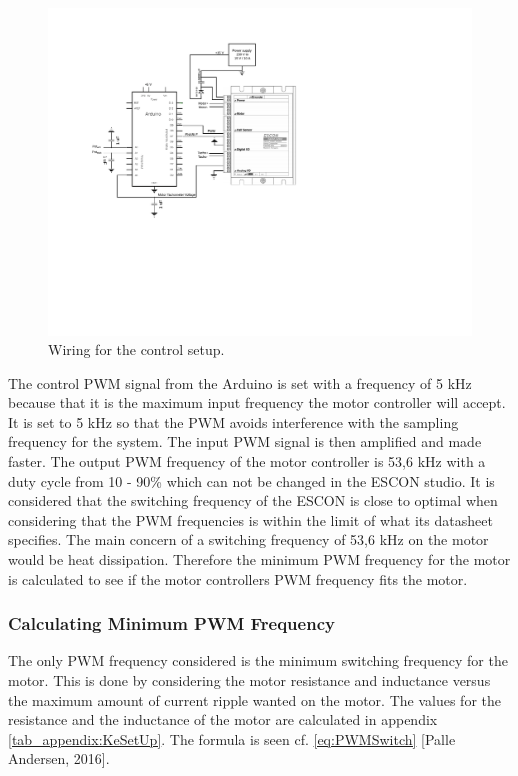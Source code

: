 \begin{figure}[htbp]
\centering
\includegraphics[width=0.85\linewidth]{figures/MotorControllerSetup}
\caption{Wiring for the control setup.}
\label{fig:EsconWiring}
\end{figure}
\newpage
The control PWM signal from the Arduino is set with a frequency of 5 kHz because that it is the maximum input frequency the motor controller will accept. It is set to 5 kHz so that the PWM avoids interference with the sampling frequency for the system.
The input PWM signal is then amplified and made faster. The output PWM frequency of the motor controller is 53,6 kHz with a duty cycle from 10 - 90\% which can not be changed in the ESCON studio. It is considered that the switching frequency of the ESCON is close to optimal when considering that the PWM frequencies is within the limit of what its datasheet specifies.   The main concern of a switching frequency of 53,6 kHz on the motor would be heat dissipation. Therefore the minimum PWM frequency for the motor is calculated to see if the motor controllers PWM frequency fits the motor.

\subsubsection{Calculating Minimum PWM Frequency}
The only PWM frequency considered is the minimum switching frequency for the motor. This is done by considering the motor resistance and inductance versus the maximum amount of current ripple wanted on the motor. The values for the resistance and the inductance of the motor are calculated in appendix \ref{tab_appendix:KeSetUp}. The formula is seen cf. \ref{eq:PWMSwitch} [Palle Andersen, 2016].

